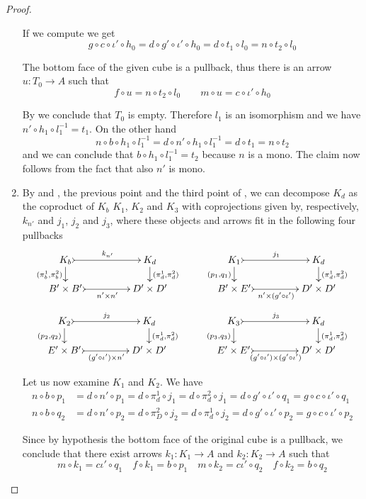 \documentclass[3p]{elsarticle}
\theoremstyle{remark}
\theoremstyle{definition}
\begin{document}
\begin{proof}
\begin{enumerate}
		If we compute we get
		\[g\circ c \circ \iota' \circ h_0=d\circ g'\circ \iota' \circ h_0=d\circ t_1\circ l_0=n\circ t_2\circ l_0\]
		
		The bottom face of the given cube is a pullback, thus there is an arrow $u\colon T_0\to A$ such that 
		\[f\circ u=n\circ t_2\circ l_0 \qquad m\circ u=c\circ \iota'\circ h_0\]
		
	By  we conclude that $T_0$ is empty. Therefore $l_1$ is an isomorphism and we have $n'\circ h_1\circ l^{-1}_1=t_1$. On the other hand
\[n\circ b\circ h_1\circ l^{-1}_1=d\circ n'\circ h_1\circ l^{-1}_1=d\circ t_1=n\circ t_2\]
and we can conclude that $b\circ h_1\circ l^{-1}_1=t_2$ because $n$ is a mono. The claim now follows from the fact that  also $n'$ is mono.
		
		\item By  and , the previous point and the third point of , we can decompose $K_d$ as the coproduct of $K_b$ $K_1$, $K_2$ and $K_3$ with coprojections given by, respectively, $k_{n'}$ and $j_1$, $j_2$ and $j_3$, where these objects and arrows fit in the following four pullbacks
		\[\xymatrix@C=45pt@R=15pt{K_b \ar@{>->}[r]^{k_{n'}}  \ar[d]_{(\pi^1_b, \pi^2_b)}& K_d   \ar[d]^{(\pi^1_d, \pi^2_d)}& K_1 \ar@{>->}[r]^{j_1}  \ar[d]_{(p_1, q_1)} & K_d \ar[d]^{(\pi^1_d, \pi^2_d)} \\
			B'\times B' \ar@{>->}[r]_-{n'\times n'} & D'\times D' & B'\times E' \ar@{>->}[r]_-{n'\times (g'\circ \iota')} & D'\times D'}\]
		\[ \xymatrix@C=45pt@R=15pt{K_2 \ar@{>->}[r]^{j_2}  \ar[d]_{(p_2, q_2)}& K_d   \ar[d]^{(\pi^1_d, \pi^2_d)}& K_3 \ar@{>->}[r]^{j_3}  \ar[d]_{(p_3, q_3)} & K_d \ar[d]^{(\pi^1_d, \pi^2_d)} \\
			E'\times B' \ar@{>->}[r]_-{(g'\circ \iota') \times n'} & D'\times D' & E'\times E' \ar@{>->}[r]_-{(g'\circ \iota')\times (g'\circ \iota')} & D'\times D'}\]

Let us now examine $K_1$ and $K_2$. We have
\begin{align*}
	n\circ b\circ p_1&=d\circ n'\circ p_1=d\circ \pi^1_d\circ j_1=d\circ \pi^2_d\circ j_1=d\circ g'\circ \iota'\circ q_1=g\circ c \circ \iota'\circ q_1\\
	n\circ b\circ q_2 &=d\circ n'\circ p_2=d\circ\pi^2_D\circ j_2
	=d\circ \pi^1_d\circ j_2=d\circ g'\circ \iota'\circ p_2 = g\circ c \circ \iota'\circ p_2
\end{align*}

Since by hypothesis the bottom face of the original cube is a pullback, we conclude that there exist arrows $k_1\colon  K_1\to A$ and $k_2\colon K_2\to A$ such that
\[m\circ k_1= c \iota'\circ q_1 \quad f\circ k_1=b\circ p_1 \quad m\circ k_2=c \iota'\circ q_2 \quad f\circ k_2=b\circ q_2\]


\end{enumerate}
\end{proof}
\end{document}
